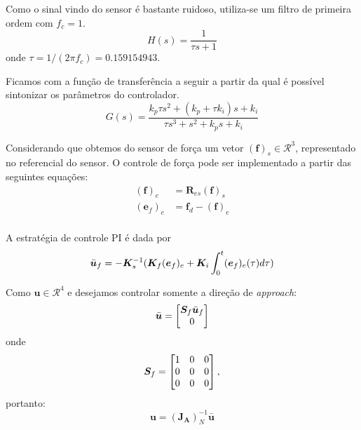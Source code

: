 Como o sinal vindo do sensor é bastante ruidoso, utiliza-se um filtro de primeira ordem com $f_c = 1$.
\begin{equation}
H(s) = \frac{1}{\tau s + 1}
\end{equation}
onde $\tau = 1/(2 \pi f_c) = 0.159154943$.

Ficamos com a função de transferência a seguir a partir da qual é possível sintonizar os parâmetros do controlador.
\begin{equation}
G(s) = \frac{k_p \tau s^2 + (k_p + \tau k_i)s + k_i}{\tau s^3 + s^2 + k_p s + k_i}
\end{equation}

Considerando que obtemos do sensor de força um vetor $(\bm{f})_s \in \mathcal{R}^3$, representado no referencial do sensor. O controle de força pode ser implementado a partir das seguintes equações:
\begin{align}
(\bm{f})_e &= \bm{R}_{es} (\bm{f})_s \\
(\bm{e}_f)_e &= \bm{f}_d - (\bm{f})_e \\
\end{align}

A estratégia de controle PI é dada por
\begin{equation}
\bar{\bm{u}}_f = -\bm{K}_s^{-1} (\bm{K}_f (\bm{e}_f)_e + \bm{K}_i \int_0^t (\bm{e}_f)_e (\tau)d\tau)\\
\end{equation}

Como $\bm{u} \in \mathcal{R}^4$  e desejamos controlar somente a direção de \textit{approach}:
\begin{equation}
\bar{\bm{u}} = \begin{bmatrix} \bm{S}_f \bar{\bm{u}}_f \\ 0\end{bmatrix} 
\end{equation}
onde 
\begin{equation}
\bm{S}_f = \begin{bmatrix}
  1 & 0 & 0 \\
  0 & 0 & 0 \\
  0 & 0 & 0
\end{bmatrix},
\end{equation}
portanto:
\begin{equation}
\bm{u} = (\bm{J_A})_N^{-1} \bar{\bm{u}}
\end{equation}



